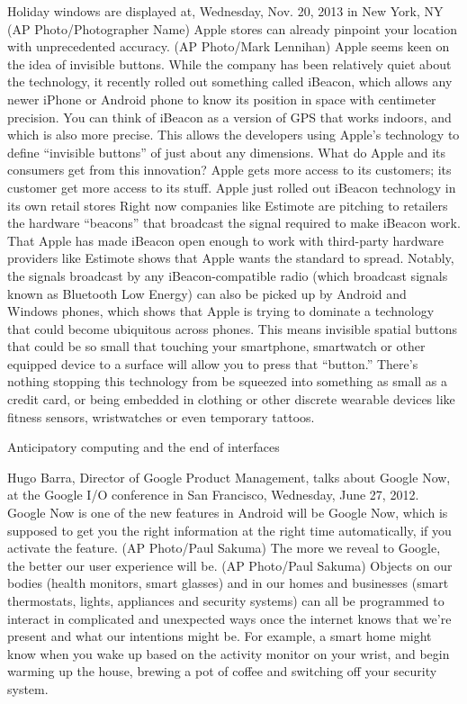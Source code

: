 Holiday windows are displayed at, Wednesday, Nov. 20, 2013 in New York, NY (AP Photo/Photographer Name)
Apple stores can already pinpoint your location with unprecedented accuracy. (AP Photo/Mark Lennihan)
Apple seems keen on the idea of invisible buttons. While the company has been relatively quiet about the technology, it recently rolled out something called iBeacon, which allows any newer iPhone or Android phone to know its position in space with centimeter precision. You can think of iBeacon as a version of GPS that works indoors, and which is also more precise. This allows the developers using Apple’s technology to define “invisible buttons” of just about any dimensions.
What do Apple and its consumers get from this innovation? Apple gets more access to its customers; its customer get more access to its stuff. Apple just rolled out iBeacon technology in its own retail stores
Right now companies like Estimote are pitching to retailers the hardware “beacons” that broadcast the signal required to make iBeacon work. That Apple has made iBeacon open enough to work with third-party hardware providers like Estimote shows that Apple wants the standard to spread. Notably, the signals broadcast by any iBeacon-compatible radio (which broadcast signals known as Bluetooth Low Energy) can also be picked up by Android and Windows phones, which shows that Apple is trying to dominate a technology that could become ubiquitous across phones. This means invisible spatial buttons that could be so small that touching your smartphone, smartwatch or other equipped device to a surface will allow you to press that “button.” There’s nothing stopping this technology from be squeezed into something as small as a credit card, or being embedded in clothing or other discrete wearable devices like fitness sensors, wristwatches or even temporary tattoos.


Anticipatory computing and the end of interfaces

Hugo Barra, Director of Google Product Management, talks about Google Now, at the Google I/O conference in San Francisco, Wednesday, June 27, 2012. Google Now is one of the new features in Android will be Google Now, which is supposed to get you the right information at the right time automatically, if you activate the feature. (AP Photo/Paul Sakuma)
The more we reveal to Google, the better our user experience will be. (AP Photo/Paul Sakuma)
Objects on our bodies (health monitors, smart glasses) and in our homes and businesses (smart thermostats, lights, appliances and security systems) can all be programmed to interact in complicated and unexpected ways once the internet knows that we’re present and what our intentions might be. For example, a smart home might know when you wake up based on the activity monitor on your wrist, and begin warming up the house, brewing a pot of coffee and switching off your security system. 


